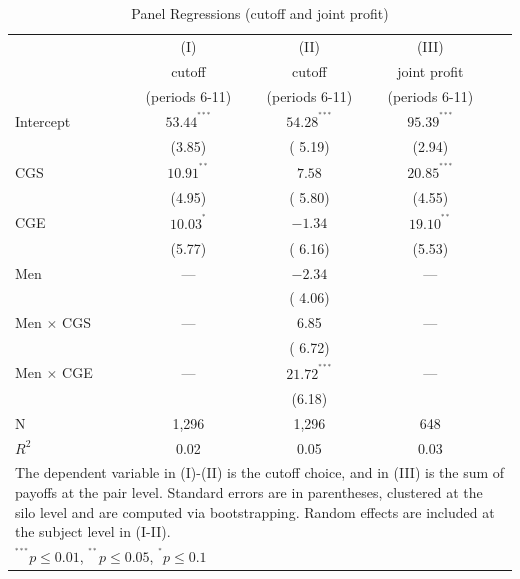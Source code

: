 \documentclass[12pt, letterpaper]{article}
\theoremstyle{plain}
\begin{document}
\begin{table}[ht]
\centering
\caption{Panel Regressions (cutoff and joint profit)}
\footnotesize
\begin{tabular}{lcccc}
\hline
  & (I) & (II) & (III)  \\
&   cutoff  & cutoff & joint profit   \\
&  (periods 6-11) & (periods 6-11)  & (periods 6-11)   \\
    \hline
Intercept  &  $53.44^{^{***}}$ &$54.28^{^{***}}$ &  $95.39^{^{***}}$ \\
 & (3.85) & ( 5.19) & (2.94) \\
CGS  &  $10.91^{^{**}}$ & $  7.58$ &  $20.85^{^{***}}$ \\
 & (4.95) & ( 5.80) & (4.55) \\
CGE & $10.03^{^{*}}$ & $-1.34$ &  $19.10^{^{**}}$ \\
 & (5.77) & ( 6.16) & (5.53) \\
Men &  --- &  $-2.34$ & ---  \\
& & ( 4.06) &  \\
Men $\times$ CGS & ---& 6.85 & ---\\
& & ( 6.72) & \\
Men $\times$ CGE& ---&  $ 21.72^{^{***}} $ & --- \\
 & &(6.18)& \\

\hline
N &  1,296 & 1,296 & 648 \\ 
$R^2$  & 0.02 & 0.05 & 0.03 \\
\hline
\hline
 \multicolumn{5}{p{.7\textwidth}}{\scriptsize{The dependent variable in (I)-(II) is the cutoff choice, and in (III) is the sum of payoffs at the pair level. Standard errors are in parentheses, clustered at the silo level and are computed via bootstrapping. Random effects are included at the subject level in (I-II).}}\\ 
 \multicolumn{4}{p{0.4\textwidth}}{\scriptsize{ $^{^{***}}p\leq0.01$,
    $^{^{**}}p\leq0.05$, $^{^{*}}p\leq0.1$}} \\
\end{tabular}
\label{table:ols_cutoff_appendix}
\end{table}
\end{document}
